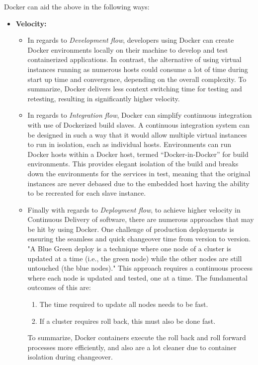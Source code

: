 Docker can aid the above in the following ways:
\begin{itemize}
\item \textbf{Velocity:}
	\begin{itemize}
	\item In regards to \emph{Development flow}, developers using Docker can create Docker environments locally on their machine to develop and test containerized applications. In contrast, the alternative of using virtual instances running as numerous hosts could consume a lot of time during start up time and convergence, depending on the overall complexity\cite{willis}. To summarize, Docker delivers less context switching time for testing and retesting, resulting in significantly higher velocity.
    \item In regards to \emph{Integration flow}, Docker can simplify continuous integration with use of Dockerized build slaves.  A continuous integration system can be designed in such a way that it would allow multiple virtual instances to run in isolation, each as individual hosts. Environments can run Docker hosts within a Docker host, termed “Docker-in-Docker” for build environments. This provides elegant isolation of the build and breaks down the environments for the services in test, meaning that the original instances are never debased due to the embedded host having the ability to be recreated for each slave instance\cite{willis}. 
    \item Finally with regards to \emph{Deployment flow}, to achieve higher velocity in  Continuous Delivery of software, there are numerous approaches that may be hit by using Docker. One challenge of production deployments is ensuring the seamless and quick changeover time from version to version. "A Blue Green deploy is a technique where one node of a cluster is updated at a time (i.e., the green node) while the other nodes are still untouched (the blue nodes)."\cite{willis} This approach requires a continuous process where each node is updated and tested, one at a time. The fundamental outcomes  of this are:
	\begin{enumerate}
		\item The time required to update all nodes needs to be fast.
    	\item If a cluster requires roll back, this must also be done fast.  
	\end{enumerate}
    To summarize, Docker containers execute the roll back and roll forward processes more efficiently, and also are a lot cleaner due to container isolation during changeover.

\end{itemize}
\end{itemize}
